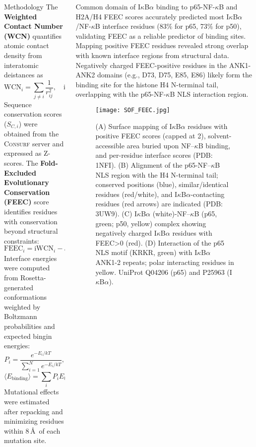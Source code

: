 \documentclass[xcolor={table}]{beamer}
\begin{document}
\begin{frame}[fragile=singleslide,t]
\begin{columns}[onlytextwidth,T]
\begin{column}{.47\textwidth}
\begin{block}{Methodology}
The \textbf{Weighted Contact Number (WCN)} quantifies atomic contact density from interatomic deistances as
\[
\mathrm{WCN}_i = \sum_{j \neq i} \frac{1}{r_{ij}^2}, \quad
\mathrm{iWCN}_i = \frac{1}{\mathrm{WCN}_i}.
\]
Sequence conservation scores (\(S_{C,i}\)) were obtained from the \textsc{Consurf} server and expressed as Z-scores. The \textbf{Fold-Excluded Evolutionary Conservation (FEEC)} score identifies residues with conservation beyond structural constraints:
\[
\mathrm{FEEC}_i = \mathrm{iWCN}_i - S_{C,i}.
\]
Interface energies were computed from Rosetta-generated conformations weighted by Boltzmann probabilities and expected bingin energies:
\[
P_i = \frac{e^{-E_i/kT}}{\sum_{i=1}^N e^{-E_i/kT}},
\]
\[
\langle E_{\text{binding}} \rangle = \sum_i P_i E_{b,i}, \quad E_{b,i} = E_{\text{complex},i} - (E_{A,i} + E_{B,i}).
\]
Mutational effects were estimated after repacking and minimizing residues within 8\,\AA\ of each mutation site.
\end{block}

\end{column}


\begin{column}{.47\textwidth}
\begin{block}{Common domain of I$\kappa$B$\alpha$ binding to p65-NF-$\kappa$B and H2A/H4}
FEEC scores accurately predicted most I$\kappa$B$\alpha$/NF-$\kappa$B interface residues (83\% for p65, 73\% for p50), validating FEEC as a reliable predictor of binding sites.
Mapping positive FEEC residues revealed strong overlap with known interface regions from structural data.
Negatively charged FEEC-positive residues in the ANK1-ANK2 domains (e.g., D73, D75, E85, E86) likely form the binding site for the histone H4 N-terminal tail, overlapping with the p65-NF-$\kappa$B NLS interaction region.
\begin{figure}
\texttt{[image: SOF\_FEEC.jpg]}
\caption{(A) Surface mapping of I$\kappa$B$\alpha$ residues with positive FEEC scores (capped at 2), solvent-accessible area buried upon NF--$\kappa$B binding, and per-residue interface scores (PDB: 1NFI). 
(B) Alignment of the p65-NF--$\kappa$B NLS region with the H4 N-terminal tail; conserved positions (blue), similar/identical residues (red/white), and I$\kappa$B$\alpha$-contacting residues (red arrows) are indicated (PDB: 3UW9). 
(C) I$\kappa$B$\alpha$ (white)-NF--$\kappa$B (p65, green; p50, yellow) complex showing negatively charged I$\kappa$B$\alpha$ residues with FEEC>0  (red). 
(D) Interaction of the p65 NLS motif (KRKR, green) with I$\kappa$B$\alpha$ ANK1-2 repeats; polar interacting residues in yellow. UniProt Q04206 (p65) and P25963 (I$\kappa$B$\alpha$).}
\end{figure}
\end{block}
\end{column}
\end{columns}
 \vspace{-1ex}%
\printbibliography
\end{frame}
\end{document}
